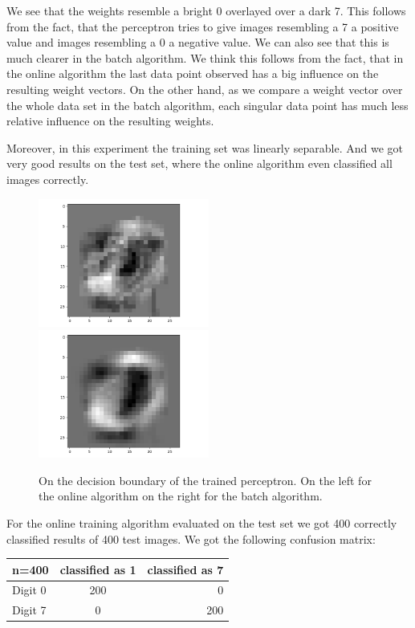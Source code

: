 We see that the weights resemble a bright 0 overlayed over a dark 7. This follows from the fact, that the perceptron tries to give images resembling a 7 a positive value and images resembling a 0 a negative value. We can also see that this is much clearer in the batch algorithm. We think this follows from the fact, that in the online algorithm the last data point observed has a big influence on the resulting weight vectors. On the other hand, as we compare a weight vector over the whole data set in the batch algorithm, each singular data point has much less relative influence on the resulting weights.

Moreover, in this experiment the training set was linearly separable. And we got very good results on the test set, where the online algorithm even classified all images correctly. 

\begin{figure}
\includegraphics[width = 0.5\textwidth]{figures/weights_image_online}
\includegraphics[width = 0.5\textwidth]{figures/weights_image_batch}
\caption{On the decision boundary of the trained perceptron. On the left for the online algorithm on the right for the batch algorithm.}
\label{perceptron:decision:5d}
\end{figure}

For the online training algorithm evaluated on the test set we got 400 correctly classified results of 400 test images. We got the following confusion matrix:

\begin{tabular}{ l | c | r }
\centering
  n=400 & classified as 1 & classified as 7 \\ \hline
  Digit 0 & 200 & 0 \\
  Digit 7 & 0 & 200 \\
\end{tabular}

